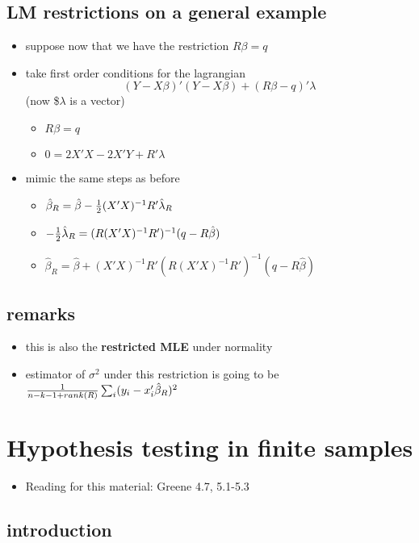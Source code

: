 \subsection{LM restrictions on a general example}
\label{sec-1-3}

\begin{itemize}
\item suppose now that we have the restriction $R\beta = q$
\item take first order conditions for the lagrangian
      \[ (Y - X\beta)'(Y - X\beta) + (R\beta - q)'\lambda \]
      (now \$$\lambda$ is a vector)
\begin{itemize}
\item $R\beta = q$
\item $0 = 2 X'X - 2 X'Y + R' \lambda$
\end{itemize}
\item mimic the same steps as before
\begin{itemize}
\item $\hat\beta_R = \hat\beta - {1\over2} (X'X)^{-1} R'\hat\lambda_R$
\item $-{1\over2} \hat\lambda_R = (R(X'X)^{-1}R')^{-1}(q - R\hat\beta)$
\item $\hat\beta_R = \hat\beta + (X'X)^{-1} R'(R(X'X)^{-1}R')^{-1}
        (q - R\hat\beta)$
\end{itemize}
\end{itemize}
\subsection{remarks}
\label{sec-1-4}

\begin{itemize}
\item this is also the \textbf{restricted MLE} under normality
\item estimator of $\sigma^2$ under this restriction is going to be ${1
      \over n - k - 1 + rank(R)} \sum_i (y_i - x_i'\hat\beta_R)^2$
\end{itemize}
\section{Hypothesis testing in finite samples}
\label{sec-2}

\begin{itemize}
\item Reading for this material: Greene 4.7, 5.1-5.3
\end{itemize}
\subsection{introduction}
\label{sec-2-1}

